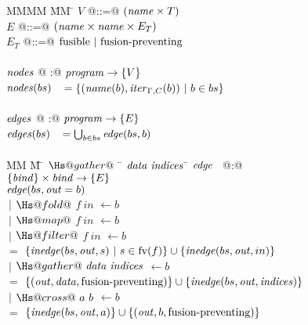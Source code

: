 \begin{figure}
\begin{tabbing}
MMMM       \= MM  \= \kill
$V$ \> @::=@ \> $(\mathit{name} \times T)$ \\
$E$ \> @::=@ \> $(\mathit{name} \times \mathit{name} \times E_T)$ \\
$E_T$ \> @::=@ \> $\mathrm{fusible} ~|~ \mbox{fusion-preventing}$ \\
\\
$\mathit{nodes}$     \> @  :@ \> $\mathit{program} \to \{V\}$                          \\
$\mathit{nodes}(bs)$ \> $~~= \{(\mathit{name}(b), \mathit{iter}_{\Gamma,C}(b)) ~|~ b \in bs\}$
\\
\\
$\mathit{edges}$     \> @  :@ \> $\mathit{program} \to \{E\}$                          \\
$\mathit{edges}(bs)$ \> $~~= \bigcup_{b \in bs} \mathit{edge}(bs, b)$
\\
\\
MM             \= M \= $\Hs@gather@~$ \= $\mathit{data}~\mathit{indices}$ \= \kill
$\mathit{edge}$      \> ~@:@ \> $\{\mathit{bind}\} \times \mathit{bind} \to \{E\}$ \\
$\mathit{edge}(bs, \mathit{out} = b)$ \\
   \> $~|$ \> $\Hs@fold@$ \> $f~in$ \> $\gets b$ \\
   \> $~|$ \> $\Hs@map@$ \> $f~in$ \> $\gets b$ \\
   \> $~|$ \> $\Hs@filter@$ \> $f~in$ \> $\gets b$ \\
    \> $=$    \> $\{\mathit{inedge}(bs,\mathit{out},s) ~|~ s \in \textrm{fv}(f)\} \cup \{\mathit{inedge}(bs, \mathit{out}, in) \}$
\\[1ex]
   \> $~|$ \> $\Hs@gather@~\data~\indices$ \> \> $\gets b$ \\
    \> $=$    \> $\{(\mathit{out},\mathit{data}, \mbox{fusion-preventing}) \} \cup \{\mathit{inedge}(bs, \mathit{out}, \mathit{indices}) \}$      
\\[1ex]
   \> $~|$ \> $\Hs@cross@~a~b$ \> \> $\gets b$ \\
    \> $=$    \> $\{\mathit{inedge}(bs, \mathit{out}, a) \}           \cup      \{(\mathit{out}, b, \mbox{fusion-preventing}) \}$

\end{tabbing}
\end{figure}
